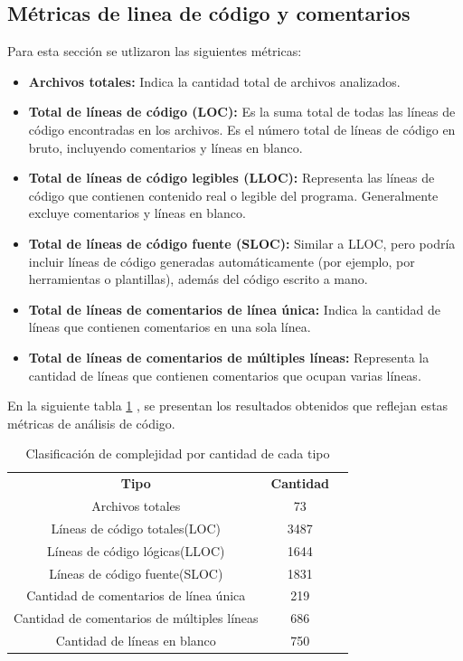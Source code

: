 \documentclass[10pt,times,twocolumn]{article}
\begin{document}
\subsection{Métricas de linea de código y comentarios}
Para esta sección se utlizaron las siguientes métricas:
\begin{itemize}
\item\textbf{Archivos totales:} Indica la cantidad total de archivos analizados.
\item\textbf{Total de líneas de código (LOC):} Es la suma total de todas las líneas de código encontradas en los archivos. Es el número total de líneas de código en bruto, incluyendo comentarios y líneas en blanco.
\item\textbf{Total de líneas de código legibles (LLOC):} Representa las líneas de código que contienen contenido real o legible del programa. Generalmente excluye comentarios y líneas en blanco.
\item\textbf{Total de líneas de código fuente (SLOC):} Similar a LLOC, pero podría incluir líneas de código generadas automáticamente (por ejemplo, por herramientas o plantillas), además del código escrito a mano.
\item\textbf{Total de líneas de comentarios de línea única:} Indica la cantidad de líneas que contienen comentarios en una sola línea.
\item\textbf{Total de líneas de comentarios de múltiples líneas:} Representa la cantidad de líneas que contienen comentarios que ocupan varias líneas.
\end{itemize}

 En la siguiente tabla \ref{tab:cantidad_LDC_Comentarios} , se presentan los resultados obtenidos que reflejan estas métricas de análisis de código.


	\begin{table}[ht]
	    \begin{tabular}{ccc}
	    	\rowcolor{gray!15}
	        \textbf{Tipo} & \textbf{Cantidad} \\
	        Archivos totales & 73 \\
	        Líneas de código totales(LOC) & 3487 \\
	        Líneas de código lógicas(LLOC) & 1644 \\
	        Líneas de código fuente(SLOC) & 1831 \\
	        Cantidad de comentarios de línea única  & 219 \\
	        Cantidad de comentarios de múltiples líneas & 686 \\
                  Cantidad de líneas en blanco & 750\\
	    \end{tabular}
	    \centering
	    \caption{Clasificación de complejidad por cantidad de cada tipo}
	    \label{tab:cantidad_LDC_Comentarios}
	\end{table}
\end{document}
